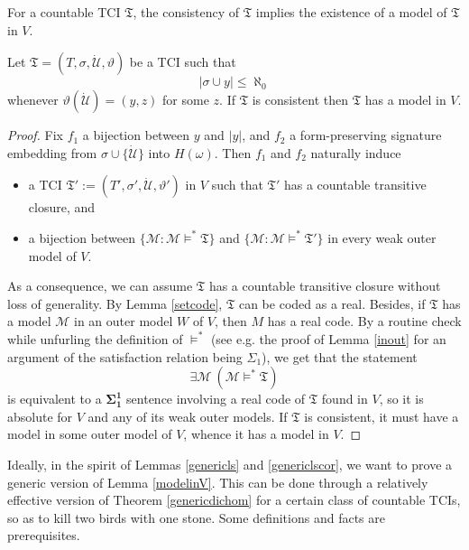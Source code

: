 \documentclass[12pt]{article}
\numberwithin{equation}{section}
\begin{document}
For a countable TCI $\mathfrak{T}$, the consistency of $\mathfrak{T}$ implies the existence of a model of $\mathfrak{T}$ in $V$. 

\begin{lem}\label{modelinV}
Let $\mathfrak{T} = (T, \sigma, \dot{\mathcal{U}}, \vartheta)$ be a TCI such that $$|\sigma \cup y| \leq \aleph_0$$ whenever $\vartheta(\dot{\mathcal{U}}) = (y, z)$ for some $z$. If $\mathfrak{T}$ is consistent then $\mathfrak{T}$ has a model in $V$.
\end{lem}

\begin{proof}
Fix $f_1$ a bijection between $y$ and $|y|$, and $f_2$ a form-preserving signature embedding from $\sigma \cup \{\dot{\mathcal{U}}\}$ into $H(\omega)$. Then $f_1$ and $f_2$ naturally induce
\begin{itemize}
    \item a TCI $\mathfrak{T}' := (T', \sigma', \dot{\mathcal{U}}, \vartheta')$ in $V$ such that $\mathfrak{T}'$ has a countable transitive closure, and
    \item a bijection between $\{\mathcal{M} : \mathcal{M} \models^* \mathfrak{T}\}$ and $\{\mathcal{M} : \mathcal{M} \models^* \mathfrak{T}'\}$ in every weak outer model of $V$.
\end{itemize}
As a consequence, we can assume $\mathfrak{T}$ has a countable transitive closure without loss of generality. By Lemma \ref{setcode}, $\mathfrak{T}$ can be coded as a real. Besides, if $\mathfrak{T}$ has a model $\mathcal{M}$ in an outer model $W$ of $V$, then $M$ has a real code. By a routine check while unfurling the definition of $\models^*$ (see e.g. the proof of Lemma \ref{inout} for an argument of the satisfaction relation being $\Sigma_1$), we get that the statement $$\exists \mathcal{M} \ (\mathcal{M} \models^* \mathfrak{T})$$ is equivalent to a $\mathbf{\Sigma^1_1}$ sentence involving a real code of $\mathfrak{T}$ found in $V$, so it is absolute for $V$ and any of its weak outer models. If $\mathfrak{T}$ is consistent, it must have a model in some outer model of $V$, whence it has a model in $V$.
\end{proof}

Ideally, in the spirit of Lemmas \ref{genericls} and \ref{genericlscor}, we want to prove a generic version of Lemma \ref{modelinV}. This can be done through a relatively effective version of Theorem \ref{genericdichom} for a certain class of countable TCIs, so as to kill two birds with one stone. Some definitions and facts are prerequisites.
\end{document}
